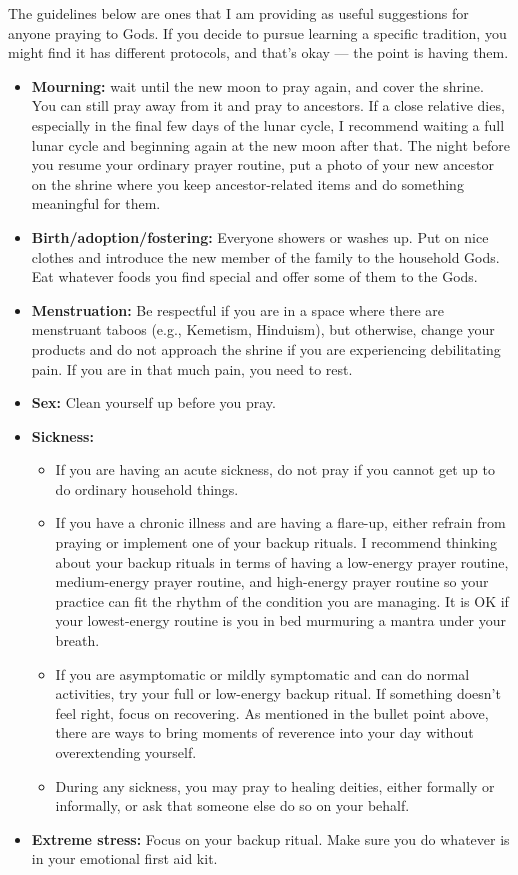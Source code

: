 \documentclass[
]{book}
\providecommand{\tightlist}{%
  \setlength{\itemsep}{0pt}\setlength{\parskip}{0pt}}
\begin{document}
The guidelines below are ones that I am providing as useful suggestions for anyone praying to Gods. If you decide to pursue learning a specific tradition, you might find it has different protocols, and that's okay --- the point is having them.

\begin{itemize}
\tightlist
\item
  \textbf{Mourning:} wait until the new moon to pray again, and cover the shrine. You can still pray away from it and pray to ancestors. If a close relative dies, especially in the final few days of the lunar cycle, I recommend waiting a full lunar cycle and beginning again at the new moon after that. The night before you resume your ordinary prayer routine, put a photo of your new ancestor on the shrine where you keep ancestor-related items and do something meaningful for them.
\item
  \textbf{Birth/adoption/fostering:} Everyone showers or washes up. Put on nice clothes and introduce the new member of the family to the household Gods. Eat whatever foods you find special and offer some of them to the Gods.
\item
  \textbf{Menstruation:} Be respectful if you are in a space where there are menstruant taboos (e.g., Kemetism, Hinduism), but otherwise, change your products and do not approach the shrine if you are experiencing debilitating pain. If you are in that much pain, you need to rest.
\item
  \textbf{Sex:} Clean yourself up before you pray.
\item
  \textbf{Sickness:}

  \begin{itemize}
  \tightlist
  \item
    If you are having an acute sickness, do not pray if you cannot get up to do ordinary household things.
  \item
    If you have a chronic illness and are having a flare-up, either refrain from praying or implement one of your backup rituals. I recommend thinking about your backup rituals in terms of having a low-energy prayer routine, medium-energy prayer routine, and high-energy prayer routine so your practice can fit the rhythm of the condition you are managing. It is OK if your lowest-energy routine is you in bed murmuring a mantra under your breath.
  \item
    If you are asymptomatic or mildly symptomatic and can do normal activities, try your full or low-energy backup ritual. If something doesn't feel right, focus on recovering. As mentioned in the bullet point above, there are ways to bring moments of reverence into your day without overextending yourself.
  \item
    During any sickness, you may pray to healing deities, either formally or informally, or ask that someone else do so on your behalf.
  \end{itemize}
\item
  \textbf{Extreme stress:} Focus on your backup ritual. Make sure you do whatever is in your emotional first aid kit.
\end{itemize}
\end{document}
